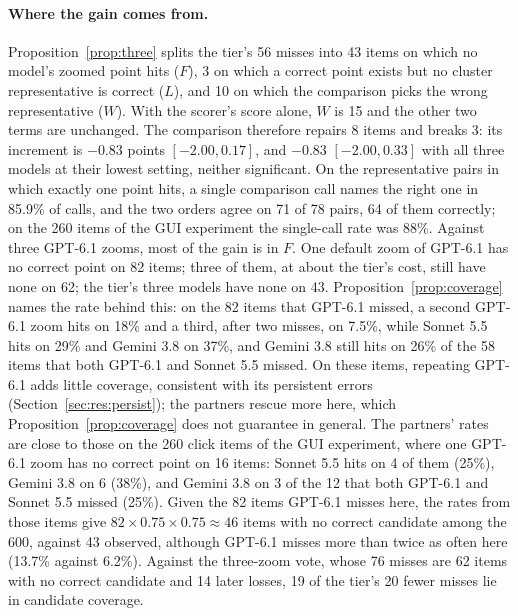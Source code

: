 \paragraph{Where the gain comes from.} Proposition~\ref{prop:three} splits the tier's 56 misses into 43 items on which no model's zoomed point hits ($F$), 3 on which a correct point exists but no cluster representative is correct ($L$), and 10 on which the comparison picks the wrong representative ($W$). With the scorer's score alone, $W$ is 15 and the other two terms are unchanged. The comparison therefore repairs 8 items and breaks 3: its increment is $-0.83$ points $[-2.00,0.17]$, and $-0.83$ $[-2.00,0.33]$ with all three models at their lowest setting, neither significant. On the representative pairs in which exactly one point hits, a single comparison call names the right one in 85.9\% of calls, and the two orders agree on 71 of 78 pairs, 64 of them correctly; on the 260 items of the GUI experiment the single-call rate was 88\%. Against three GPT-6.1 zooms, most of the gain is in $F$. One default zoom of GPT-6.1 has no correct point on 82 items; three of them, at about the tier's cost, still have none on 62; the tier's three models have none on 43. Proposition~\ref{prop:coverage} names the rate behind this: on the 82 items that GPT-6.1 missed, a second GPT-6.1 zoom hits on 18\% and a third, after two misses, on 7.5\%, while Sonnet 5.5 hits on 29\% and Gemini 3.8 on 37\%, and Gemini 3.8 still hits on 26\% of the 58 items that both GPT-6.1 and Sonnet 5.5 missed. On these items, repeating GPT-6.1 adds little coverage, consistent with its persistent errors (Section~\ref{sec:res:persist}); the partners rescue more here, which Proposition~\ref{prop:coverage} does not guarantee in general. The partners' rates are close to those on the 260 click items of the GUI experiment, where one GPT-6.1 zoom has no correct point on 16 items: Sonnet 5.5 hits on 4 of them (25\%), Gemini 3.8 on 6 (38\%), and Gemini 3.8 on 3 of the 12 that both GPT-6.1 and Sonnet 5.5 missed (25\%). Given the 82 items GPT-6.1 misses here, the rates from those items give $82\times0.75\times0.75\approx46$ items with no correct candidate among the 600, against 43 observed, although GPT-6.1 misses more than twice as often here (13.7\% against 6.2\%). Against the three-zoom vote, whose 76 misses are 62 items with no correct candidate and 14 later losses, 19 of the tier's 20 fewer misses lie in candidate coverage.

